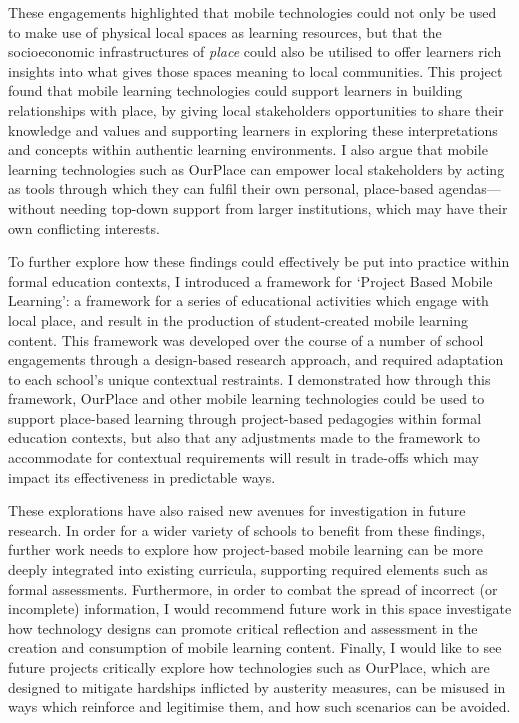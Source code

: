 These engagements highlighted that mobile technologies could not only be used to make use of physical local spaces as learning resources, but that the socioeconomic infrastructures of \textit{place} could also be utilised to offer learners rich insights into what gives those spaces meaning to local communities. This project found that mobile learning technologies could support learners in building relationships with place, by giving local stakeholders opportunities to share their knowledge and values and supporting learners in exploring these interpretations and concepts within authentic learning environments. I also argue that mobile learning technologies such as OurPlace can empower local stakeholders by acting as tools through which they can fulfil their own personal, place-based agendas---without needing top-down support from larger institutions, which may have their own conflicting interests.

To further explore how these findings could effectively be put into practice within formal education contexts, I introduced a framework for `Project Based Mobile Learning': a framework for a series of educational activities which engage with local place, and result in the production of student-created mobile learning content. This framework was developed over the course of a number of school engagements through a design-based research approach, and required adaptation to each school's unique contextual restraints. I demonstrated how through this framework, OurPlace and other mobile learning technologies could be used to support place-based learning through project-based pedagogies within formal education contexts, but also that any adjustments made to the framework to accommodate for contextual requirements will result in trade-offs which may impact its effectiveness in predictable ways.

These explorations have also raised new avenues for investigation in future research. In order for a wider variety of schools to benefit from these findings, further work needs to explore how project-based mobile learning can be more deeply integrated into existing curricula, supporting required elements such as formal assessments. Furthermore, in order to combat the spread of incorrect (or incomplete) information, I would recommend future work in this space investigate how technology designs can promote critical reflection and assessment in the creation and consumption of mobile learning content. Finally, I would like to see future projects critically explore how technologies such as OurPlace, which are designed to mitigate hardships inflicted by austerity measures, can be misused in ways which reinforce and legitimise them, and how such scenarios can be avoided.